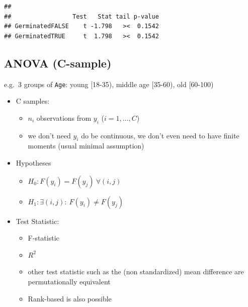 \documentclass[
]{article}
\providecommand{\tightlist}{%
  \setlength{\itemsep}{0pt}\setlength{\parskip}{0pt}}
\begin{document}
\begin{verbatim}
## 
##                 Test   Stat tail p-value
## GerminatedFALSE    t -1.798   ><  0.1542
## GerminatedTRUE     t  1.798   ><  0.1542
\end{verbatim}

\hypertarget{anova-c-sample}{%
\subsection{ANOVA (C-sample)}\label{anova-c-sample}}

e.g.~3 groups of \texttt{Age}: young {[}18-35), middle age {[}35-60),
old {[}60-100)

\begin{itemize}
\tightlist
\item
  C samples:

  \begin{itemize}
  \tightlist
  \item
    \(n_i\) observations from \(y_i\) (\(i=1,\ldots,C\))
  \item
    we don't need \(y_i\) do be continuous, we don't even need to have
    finite moments (usual minimal assumption)
  \end{itemize}
\item
  Hypotheses

  \begin{itemize}
  \tightlist
  \item
    \(H_0: F(y_i)=F(y_j)\ \forall (i,j)\)\\
  \item
    \(H_1: \exists (i,j): \ F(y_i)\neq F(y_j)\)
  \end{itemize}
\end{itemize}

\begin{itemize}
\tightlist
\item
  Test Statistic:

  \begin{itemize}
  \tightlist
  \item
    F-statistic\\
  \item
    \(R^2\)\\
  \item
    other test statistic such as the (non standardized) mean difference
    are permutationally equivalent
  \item
    Rank-based is also possible
  \end{itemize}
\end{itemize}
\end{document}

